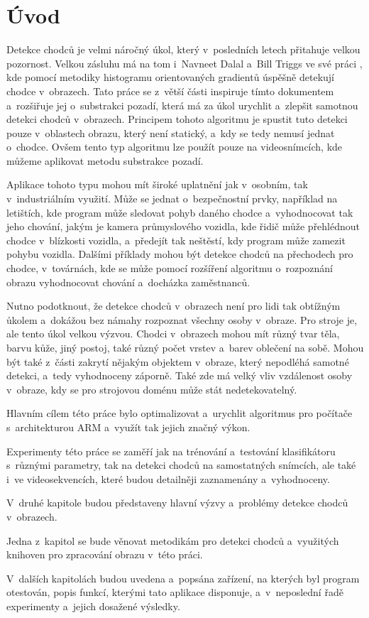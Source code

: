 \section{Úvod}
Detekce chodců je velmi náročný úkol, který v~posledních letech přitahuje velkou pozornost. Velkou zásluhu má na tom i~Navneet Dalal a~Bill Triggs ve své práci \cite{hog:dalal}, kde pomocí metodiky histogramu orientovaných gradientů úspěšně detekují chodce v~obrazech. Tato práce se z~větší části inspiruje tímto dokumentem a~rozšiřuje jej o~substrakci pozadí, která má za úkol urychlit a~zlepšit samotnou detekci chodců v~obrazech.  Principem tohoto algoritmu je spustit tuto detekci pouze v~oblastech obrazu, který není statický, a~kdy se tedy nemusí jednat o~chodce. Ovšem tento typ algoritmu lze použít pouze na videosnímcích, kde můžeme aplikovat metodu substrakce pozadí.

Aplikace tohoto typu mohou mít široké uplatnění jak v~osobním, tak v~industriálním využití. Může se jednat o~bezpečnostní prvky, například na letištích, kde program může sledovat pohyb daného chodce a~vyhodnocovat tak jeho chování, jakým je kamera průmyslového vozidla, kde řidič může přehlédnout chodce v~blízkosti vozidla, a~předejít tak neštěstí, kdy program může zamezit pohybu vozidla. Dalšími příklady mohou být detekce chodců na přechodech pro chodce, v~továrnách, kde se může pomocí rozšíření algoritmu o~rozpoznání obrazu vyhodnocovat chování a~docházka zaměstnanců. 

Nutno podotknout, že detekce chodců v~obrazech není pro lidi tak obtížným ůkolem a~dokážou bez námahy rozpoznat všechny osoby v~obraze. Pro stroje je, ale tento úkol velkou výzvou. Chodci v~obrazech mohou mít různý tvar těla, barvu kůže, jiný postoj, také různý počet vrstev a~barev oblečení na sobě. Mohou být také z~části zakrytí nějakým objektem v~obraze, který nepodléhá samotné detekci, a~tedy vyhodnoceny záporně. Také zde má velký vliv vzdálenost osoby v~obraze, kdy se pro strojovou doménu může stát nedetekovatelný. 

Hlavním cílem této práce bylo optimalizovat a~urychlit algoritmus pro počítače s~architekturou ARM a~využít tak jejich značný výkon. 

Experimenty této práce se zaměří jak na trénování a~testování klasifikátoru s~různými parametry, tak na detekci chodců na samostatných snímcích, ale také i~ve videosekvencích, které budou detailněji zaznamenány a~vyhodnoceny. 

V~druhé kapitole budou představeny hlavní výzvy a~problémy detekce chodců v~obrazech.

Jedna z~kapitol se bude věnovat metodikám pro detekci chodců a~využitých knihoven pro zpracování obrazu v~této práci. 

V~dalších kapitolách budou uvedena a~popsána zařízení, na kterých byl program otestován, popis funkcí, kterými tato aplikace disponuje, a~v~neposlední řadě experimenty a~jejich dosažené výsledky. 